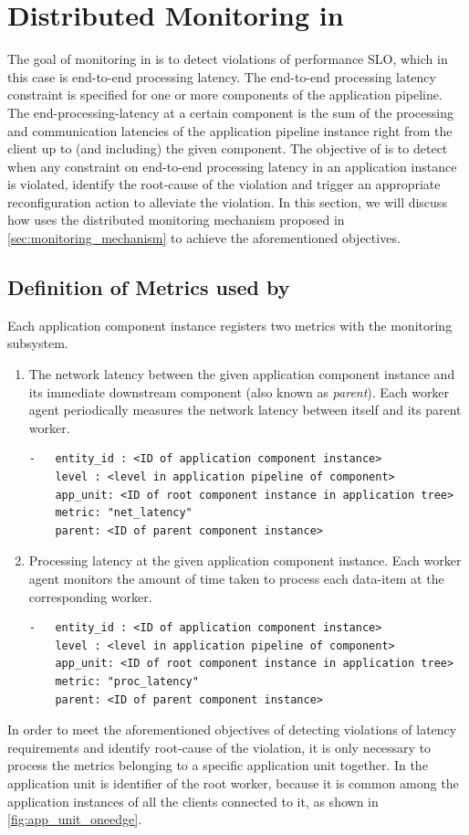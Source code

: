 \section{Distributed Monitoring in \oneedge{}}
\label{sec:oneedge_dist_mon}
The goal of monitoring in \oneedge{} is to detect violations of performance SLO, which in this case is end-to-end processing latency. The end-to-end processing latency constraint is specified for one or more components of the application pipeline. The end-processing-latency at a certain component is the sum of the processing and communication latencies of the application pipeline instance right from the client up to (and including) the given component. The objective of \oneedge{} is to detect when any constraint on end-to-end processing latency in an application instance is violated, identify the root-cause of the violation and trigger an appropriate reconfiguration action to alleviate the violation. In this section, we will discuss how \oneedge{} uses the distributed monitoring mechanism proposed in \cref{sec:monitoring_mechanism} to achieve the aforementioned objectives.

\subsection{Definition of Metrics used by \oneedge{}}
Each application component instance registers two metrics with the monitoring subsystem. 
\begin{enumerate}
\item The network latency between the given application component instance and its immediate downstream component (also known as \textit{parent}). Each worker agent periodically measures the network latency between itself and its parent worker.

\begin{verbatim}
-   entity_id : <ID of application component instance>
    level : <level in application pipeline of component>
    app_unit: <ID of root component instance in application tree>
    metric: "net_latency"
    parent: <ID of parent component instance>
\end{verbatim}
\item Processing latency at the given application component instance. Each worker agent monitors the amount of time taken to process each data-item at the corresponding worker.
\begin{verbatim}
-   entity_id : <ID of application component instance>
    level : <level in application pipeline of component>
    app_unit: <ID of root component instance in application tree>
    metric: "proc_latency"
    parent: <ID of parent component instance>
\end{verbatim}
\end{enumerate}
In order to meet the aforementioned objectives of detecting violations of latency requirements and identify root-cause of the violation, it is only necessary to process the metrics belonging to a specific application unit together. In \oneedge{} the application unit is identifier of the root worker, because it is common among the application instances of all the clients connected to it, as shown in \cref{fig:app_unit_oneedge}. 

